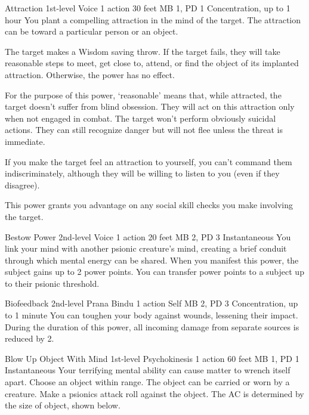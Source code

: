 \DndPowerHeader%
  {Attraction}
  {1st-level Voice}
  {1 action}
  {30 feet}
  {MB 1, PD 1}
  {Concentration, up to 1 hour}
You plant a compelling attraction in the mind of the target.
The attraction can be toward a particular person or an object.

The target makes a Wisdom saving throw.
If the target fails, they will take reasonable steps to meet,
get close to, attend, or find the object of its implanted attraction.
Otherwise, the power has no effect.

For the purpose of this power, `reasonable' means that, while attracted,
the target doesn't suffer from blind obsession.
They will act on this attraction only when not engaged in combat.
The target won't perform obviously suicidal actions.
They can still recognize danger but will not flee
unless the threat is immediate.

If you make the target feel an attraction to yourself,
you can't command them indiscriminately,
although they will be willing to listen to you (even if they disagree).

This power grants you advantage on any social skill checks
you make involving the target.

\DndPowerHeader%
  {Bestow Power}
  {2nd-level Voice}
  {1 action}
  {20 feet}
  {MB 2, PD 3}
  {Instantaneous}
You link your mind with another psionic creature's mind,
creating a brief conduit through which mental energy can be shared.
When you manifest this power,
the subject gains up to 2 power points.
You can transfer power points to a subject up to their psionic threshold.

\DndPowerHeader%
  {Biofeedback}
  {2nd-level Prana Bindu}
  {1 action}
  {Self}
  {MB 2, PD 3}
  {Concentration, up to 1 minute}
    You can toughen your body against wounds,
    lessening their impact.
    During the duration of this power, all incoming damage
    from separate sources is reduced by 2.

\DndPowerHeader%
  {Blow Up Object With Mind}
  {1st-level Psychokinesis}
  {1 action}
  {60 feet}
  {MB 1, PD 1}
  {Instantaneous}
Your terrifying mental ability can cause matter to
wrench itself apart. 
Choose an object within range.
The object can be carried or worn by a creature.
Make a psionics attack roll against the object.
The AC is determined by the size of object, shown below.


